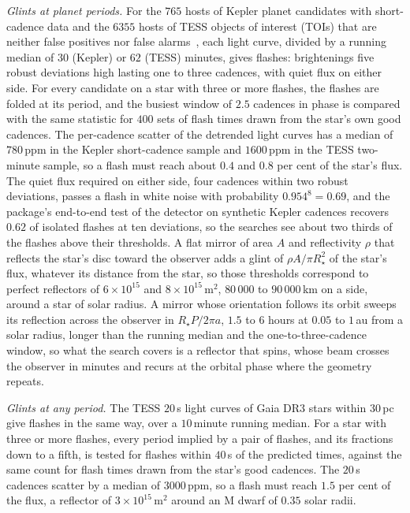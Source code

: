 \documentclass[3p,11pt]{elsarticle}
\begin{document}
\emph{Glints at planet periods.} For the $765$ hosts of Kepler planet candidates with
short-cadence data and the $6355$ hosts of TESS objects of interest (TOIs) that are
neither false positives nor false alarms~\cite{Guerrero2021}, each light curve, divided
by a running median of $30$ (Kepler) or $62$ (TESS) minutes, gives flashes: brightenings
five robust deviations high lasting one to three cadences, with quiet flux on either
side. For every candidate on a star with three or more flashes, the flashes are folded at
its period, and the busiest window of $2.5$ cadences in phase is compared with the same
statistic for $400$ sets of flash times drawn from the star's own good cadences. The
per-cadence scatter of the detrended light curves has a median of $780$\,ppm in the
Kepler short-cadence sample and $1600$\,ppm in the TESS two-minute sample, so a flash
must reach about $0.4$ and $0.8$ per cent of the star's flux. The quiet flux required on
either side, four cadences within two robust deviations, passes a flash in white noise
with probability $0.954^8=0.69$, and the package's end-to-end test of the detector on
synthetic Kepler cadences recovers $0.62$ of isolated flashes at ten deviations, so the
searches see about two thirds of the flashes above their thresholds. A flat mirror of area $A$
and reflectivity $\rho$ that reflects the star's disc toward the observer adds a glint
of $\rho A/\pi R_\star^2$ of the star's flux, whatever its distance from the star, so
those thresholds correspond to perfect reflectors of $6\times10^{15}$ and
$8\times10^{15}$\,m$^2$, $80\,000$ to $90\,000$\,km on a side, around a star of solar
radius. A mirror whose orientation follows its orbit sweeps its reflection across the
observer in $R_\star P/2\pi a$, $1.5$ to $6$ hours at $0.05$ to $1$\,au from a solar
radius, longer than the running median and the one-to-three-cadence window, so what the
search covers is a reflector that spins, whose beam crosses the observer in minutes and
recurs at the orbital phase where the geometry repeats.

\emph{Glints at any period.} The TESS $20$\,s light curves of Gaia DR3 stars within
$30$\,pc give flashes in the same way, over a $10$\,minute running median. For a star with
three or more flashes, every period implied by a pair of flashes, and its fractions down
to a fifth, is tested for flashes within $40$\,s of the predicted times, against the same
count for flash times drawn from the star's good cadences. The $20$\,s cadences scatter
by a median of $3000$\,ppm, so a flash must reach $1.5$ per cent of the flux, a
reflector of $3\times10^{15}$\,m$^2$ around an M dwarf of $0.35$ solar radii.
\end{document}
